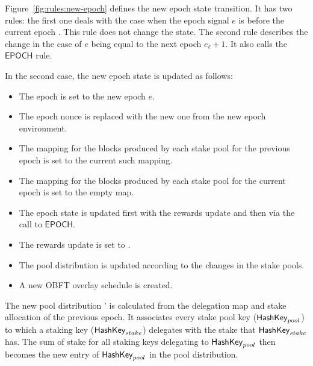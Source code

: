 Figure~\ref{fig:rules:new-epoch} defines the new epoch state transition. It
has two rules: the first one deals with the case when the epoch signal $e$ is before the
current epoch . This rule does not change the state. The second rule
describes the change in the case of $e$ being equal to the next epoch
$e_\ell+ 1$. It also calls the $\mathsf{EPOCH}$ rule.

In the second case, the new epoch state is updated as follows:

\begin{itemize}
\item The epoch is set to the new epoch $e$.
\item The epoch nonce is replaced with the new one from the new epoch
  environment.
\item The mapping for the blocks produced by each stake pool for the previous epoch
  is set to the current such mapping.
\item The mapping for the blocks produced by each stake pool for the current epoch
  is set to the empty map.
\item The epoch state is updated first with the rewards update  and then
  via the call to $\mathsf{EPOCH}$.
\item The rewards update is set to \Nothing.
\item The pool distribution is updated according to the changes in the stake pools.
\item A new OBFT overlay schedule is created.
\end{itemize}

The new pool distribution ' is calculated from the delegation map and
stake allocation of the previous epoch. It associates every stake pool key
($\mathsf{HashKey}_{pool}$) to which a staking key ($\mathsf{HashKey}_{stake}$) delegates with
the stake that $\mathsf{HashKey}_{stake}$ has. The sum of stake for all staking keys
delegating to $\mathsf{HashKey}_{pool}$ then becomes the new entry of $\mathsf{HashKey}_{pool}$
in the pool distribution.

